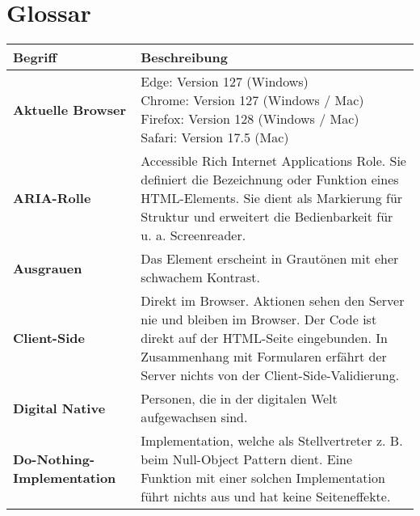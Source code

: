 \chapter{Glossar}
\label{chap:glossary}

\newcommand{\glossarywithTitle}{0.23\textwidth}
\newcommand{\glossarywith}{0.76\textwidth}

\vspace*{-1cm}
\begin{table}[!ht]
    \centering
    \footnotesize
    \begin{adjustbox}{max width=\textwidth}
        \begin{tabular}{ p{\glossarywithTitle} | p{\glossarywith} }
            \bf{Begriff} & \bf{Beschreibung} \\
            \hline \hline
            \bf{Aktuelle Browser} & \tbbr{
                Edge: Version 127 (Windows) \\
                Chrome: Version 127 (Windows / Mac) \\
                Firefox: Version 128 (Windows / Mac) \\
                Safari: Version 17.5 (Mac)
            } \\
            \hline
            \bf{ARIA-Rolle} & Accessible Rich Internet Applications Role.
                Sie definiert die Bezeichnung oder Funktion eines HTML-Elements.
                Sie dient als Markierung für Struktur und erweitert die Bedienbarkeit für u. a. Screenreader. \\
            \hline
            \bf{Ausgrauen} & Das Element erscheint in Grautönen mit eher schwachem Kontrast. \\
            \hline
            \bf{Client-Side} & Direkt im Browser. 
                Aktionen sehen den Server nie und bleiben im Browser. 
                Der Code ist direkt auf der HTML-Seite eingebunden. 
                In Zusammenhang mit Formularen erfährt der Server nichts von der Client-Side-Validierung. \\
            \hline
            \raggedright \bf{Digital Native} & Personen, die in der digitalen Welt aufgewachsen sind. \\
            \hline
            \raggedright \bf{Do-Nothing-Implementation} & 
                Implementation, welche als Stellvertreter z. B. beim Null-Object Pattern dient. 
                Eine Funktion mit einer solchen Implementation führt nichts aus und hat keine Seiteneffekte. \\

\end{tabular}
\end{adjustbox}
\end{table}
